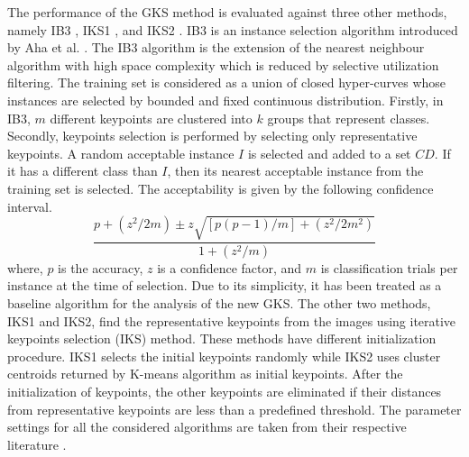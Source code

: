The performance of the GKS method is evaluated against  three other methods, namely IB3 \cite{aha1991}, IKS1 \cite{lin2016}, and IKS2 \cite{lin2016}. IB3 is an instance selection algorithm introduced by Aha et al. \cite{aha1991}. The IB3 algorithm is the extension of the nearest neighbour  algorithm with high space complexity which is reduced by selective utilization filtering. The training set is considered as a union of closed hyper-curves whose instances are selected by bounded and fixed continuous distribution. Firstly, in IB3, $m$ different keypoints are clustered into $k$ groups that represent classes. Secondly, keypoints selection is performed by selecting only representative keypoints. A random acceptable instance $I$ is selected and added to a set $CD$. If it has a different class than $I$, then its nearest acceptable instance from the training set is selected. The acceptability is given by the following confidence interval. 
\begin{equation}
\frac{p+(z^2/2m)\pm z \sqrt {[p(p-1)/m]+(z^2/2m^2)}} {1+(z^2/m)}
\end{equation}
where, $p$ is the accuracy, $z$ is a confidence factor, and $m$ is classification trials per instance at the time of selection. Due to its simplicity, it has been treated as a baseline algorithm for the analysis of the new GKS. The other two methods, IKS1 and IKS2, find the representative keypoints from the images using iterative keypoints selection (IKS) method.
These methods have different initialization procedure. IKS1 selects the initial keypoints randomly while IKS2 uses cluster centroids returned by K-means algorithm as initial keypoints. After the initialization of keypoints, the other keypoints are eliminated if their distances from representative keypoints are less than a predefined threshold. The parameter settings for all the considered algorithms are taken from their respective literature \cite{lin2016} \cite{aha1991}. 

